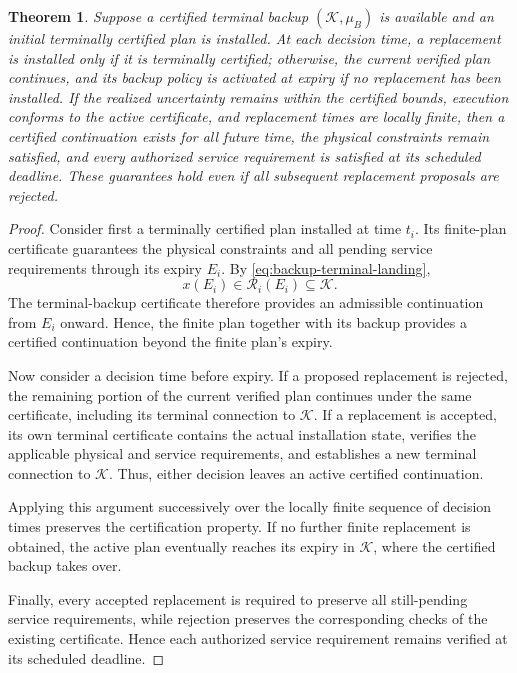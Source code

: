 \documentclass[journal,10pt]{IEEEtran}
\newtheorem{theorem}{Theorem}
\begin{document}
\begin{theorem}
\label{thm:backup-recursive-availability}
Suppose a certified terminal backup $(\mathcal K,\mu_B)$ is available and an
initial terminally certified plan is installed. At each decision time, a
replacement is installed only if it is terminally certified; otherwise, the
current verified plan continues, and its backup policy is activated at expiry
if no replacement has been installed. If the realized uncertainty remains
within the certified bounds, execution conforms to the active certificate, and
replacement times are locally finite, then a certified continuation exists
for all future time, the physical constraints remain satisfied, and every
authorized service requirement is satisfied at its scheduled deadline. These
guarantees hold even if all subsequent replacement proposals are rejected.
\end{theorem}

\begin{proof}
Consider first a terminally certified plan installed at time $t_i$. Its
finite-plan certificate guarantees the physical constraints and all pending
service requirements through its expiry $E_i$. By
\eqref{eq:backup-terminal-landing},
\[
x(E_i)\in\mathcal R_i(E_i)\subseteq\mathcal K.
\]
The terminal-backup certificate therefore provides an admissible continuation
from $E_i$ onward. Hence, the finite plan together with its backup provides a
certified continuation beyond the finite plan's expiry.

Now consider a decision time before expiry. If a proposed replacement is
rejected, the remaining portion of the current verified plan continues under
the same certificate, including its terminal connection to $\mathcal K$. If a
replacement is accepted, its own terminal certificate contains the actual
installation state, verifies the applicable physical and service requirements,
and establishes a new terminal connection to $\mathcal K$. Thus, either
decision leaves an active certified continuation.

Applying this argument successively over the locally finite sequence of
decision times preserves the certification property. If no further finite
replacement is obtained, the active plan eventually reaches its expiry in
$\mathcal K$, where the certified backup takes over.

Finally, every accepted replacement is required to preserve all still-pending
service requirements, while rejection preserves the corresponding checks of
the existing certificate. Hence each authorized service requirement remains
verified at its scheduled deadline.
\end{proof}
\end{document}
